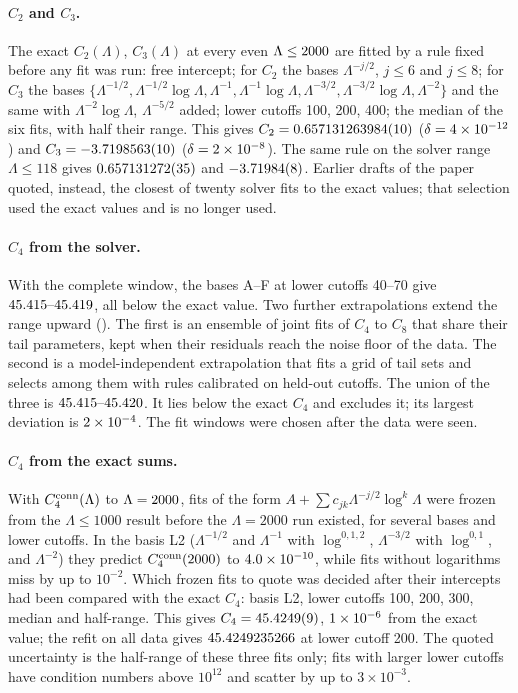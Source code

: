 \paragraph{$C_2$ and $C_3$.} The exact $C_2(\Lambda)$, $C_3(\Lambda)$ at every even $\Lambda\le2000$ are fitted
by a rule fixed before any fit was run: free intercept; for $C_2$ the bases $\Lambda^{-j/2}$, $j\le6$ and $j\le8$; for
$C_3$ the bases $\{\Lambda^{-1/2},\Lambda^{-1/2}\log\Lambda,\Lambda^{-1},\Lambda^{-1}\log\Lambda,\Lambda^{-3/2},
\Lambda^{-3/2}\log\Lambda,\Lambda^{-2}\}$ and the same with $\Lambda^{-2}\log\Lambda$, $\Lambda^{-5/2}$ added; lower
cutoffs 100, 200, 400; the median of the six fits, with half their range. This gives $C_2=0.657131263984(10)$
($\delta=4\times10^{-12}$) and $C_3=-3.7198563(10)$ ($\delta=2\times10^{-8}$). The same rule on the solver range
$\Lambda\le118$ gives $0.657131272(35)$ and $-3.71984(8)$. Earlier drafts of the paper quoted, instead, the
closest of twenty solver fits to the exact values; that selection used the exact values and is no longer used.

\paragraph{$C_4$ from the solver.} With the complete window, the bases A--F at lower cutoffs 40--70 give
$45.415\text{--}45.419$, all below the exact value. Two further extrapolations extend the range upward
(). The first is an ensemble of joint fits of $C_4$ to $C_8$ that share their tail
parameters, kept when their residuals reach the noise floor of the data. The second is a model-independent
extrapolation that fits a grid of tail sets and selects among them with rules calibrated on held-out cutoffs. The union of the three is $45.415\text{--}45.420$. It lies below the exact $C_4$ and
excludes it; its largest deviation is $2\times10^{-4}$. The fit windows were chosen after the data were seen.

\paragraph{$C_4$ from the exact sums.} With $C_4^{\rm conn}(\Lambda)$ to $\Lambda=2000$, fits of the form
$A+\sum c_{jk}\Lambda^{-j/2}\log^k\Lambda$ were frozen from the $\Lambda\le1000$ result before the $\Lambda=2000$ run
existed, for several bases and lower cutoffs. In the basis L2 ($\Lambda^{-1/2}$ and $\Lambda^{-1}$ with $\log^{0,1,2}$,
$\Lambda^{-3/2}$ with $\log^{0,1}$, and $\Lambda^{-2}$) they predict $C_4^{\rm conn}(2000)$ to $4.0\times10^{-10}$, while
fits without logarithms miss by up to $10^{-2}$. Which frozen fits to quote was decided after their intercepts had been
compared with the exact $C_4$: basis L2, lower cutoffs 100, 200, 300, median and half-range. This gives
$C_4=45.4249(9)$, $1\times10^{-6}$ from the exact value; the refit on all data gives $45.4249235266$ at lower
cutoff 200. The quoted uncertainty is the half-range of these three fits only; fits with larger lower cutoffs have
condition numbers above $10^{12}$ and scatter by up to $3\times10^{-3}$.

